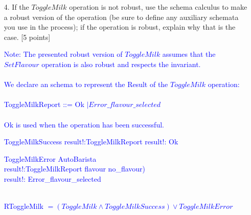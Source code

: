 \documentclass[12pt,fleqn]{article}
\newcommand{\estimates}{\mathrel{\hat{=}}}
\begin{document}
\begin{enumerate}
\begin{enumerate}
\item[4.] If the $ToggleMilk$ operation is not robust, use the schema calculus to make a robust version of the operation (be sure to define any auxiliary schemata you use in the process); if the operation is robust, explain why that is the case. [5 points]

  \textcolor{blue}{
    Note: The presented robust version of $ToggleMilk$ assumes that the $SetFlavour$ operation is also robust and respects the invariant. \\
    \\
    We declare an schema to represent the Result of the $ToggleMilk$ operation: \\
    \\
    ToggleMilkReport ::= Ok $\mid Error\_flavour\_selected$ \\
 \\
    Ok is used when the operation has been successful. \\
  \begin{schema}{ToggleMilkSuccess}
    result!:ToggleMilkReport
  \where
    result!: Ok
  \end{schema}
  }
  \textcolor{blue}{
  \begin{schema}{ToggleMilkError}
    \Delta AutoBarista \\
    result!:ToggleMilkReport
    \where
    flavour \neq no\_flavour) \\
    result!: Error\_flavour\_selected
  \end{schema}
  \\ 
  RToggleMilk $\estimates (ToggleMilk \land ToggleMilkSuccess) \lor ToggleMilkError$ \\
  }


\end{enumerate}

\end{enumerate}
\end{document}
